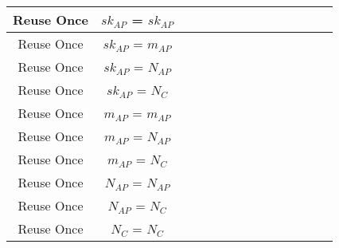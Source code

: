 \documentclass[crop]{standalone}
\newcommand{\noattack}{\color{ForestGreen}\usym{2713}\color{black}}
\newcommand{\attack}{\color{red}\usym{2717}\color{black}}
\begin{document}
{\begin{tabular}{|c|c|c|c|c|c|c|c|c|c|c|c|c|c|}
Reuse Once & $sk_{AP}$ = $sk_{AP}$ & \noattack & \noattack & \noattack & \noattack & \noattack & \noattack & \noattack & \noattack & \noattack & \noattack & \noattack & \noattack\\ \hline
Reuse Once & $sk_{AP}$ = $m_{AP}$ & \noattack & \noattack & \noattack & \noattack & \noattack & \noattack & \noattack & \noattack & \noattack & \noattack & \noattack & \noattack\\ \hline
Reuse Once & $sk_{AP}$ = $N_{AP}$ & \attack & \attack & \attack & \attack & \attack & \attack & \attack & \attack & \attack & \attack & \noattack & \noattack\\ \hline
Reuse Once & $sk_{AP}$ = $N_C$ & \attack & \attack & \attack & \attack & \attack & \attack & \attack & \attack & \attack & \attack & \noattack & \noattack\\ \hline
Reuse Once & $m_{AP}$ = $m_{AP}$ & \noattack & \noattack & \noattack & \noattack & \noattack & \noattack & \noattack & \noattack & \noattack & \noattack & \noattack & \noattack\\ \hline
Reuse Once & $m_{AP}$ = $N_{AP}$ & \attack & \attack & \attack & \attack & \attack & \attack & \attack & \attack & \attack & \attack & \noattack & \noattack\\ \hline
Reuse Once & $m_{AP}$ = $N_C$ & \attack & \attack & \attack & \attack & \attack & \attack & \attack & \attack & \attack & \attack & \noattack & \noattack\\ \hline
Reuse Once & $N_{AP}$ = $N_{AP}$ & \noattack & \noattack & \noattack & \noattack & \noattack & \noattack & \noattack & \noattack & \noattack & \noattack & \noattack & \noattack\\ \hline
Reuse Once & $N_{AP}$ = $N_C$ & \noattack & \noattack & \noattack & \noattack & \noattack & \noattack & \noattack & \noattack & \noattack & \noattack & \noattack & \noattack\\ \hline
Reuse Once & $N_C$ = $N_C$ & \noattack & \noattack & \noattack & \noattack & \noattack & \noattack & \noattack & \noattack & \noattack & \noattack & \noattack & \noattack\\ \hline
\end{tabular}}
\end{document}
